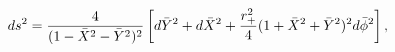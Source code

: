 \begin{equation} \label{pdisc}
ds^2 = {4 \over (1-\bar X^2 - \bar Y^2)^2} \left[ d\bar Y^2 +
    d\bar X^2 + {r_+^2 \over 4} (1+\bar X^2 + \bar Y^2)^2 d\bar
    \phi^2 \right],
\end{equation}

